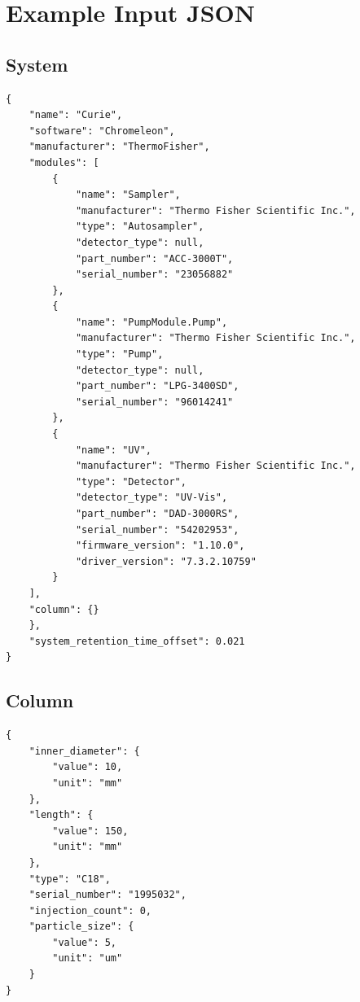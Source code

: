 \documentclass{article}
\begin{document}
\section{Example Input JSON}
\lstset{style=jsonstyle}
\subsection{System}
\begin{lstlisting}
{
    "name": "Curie",
    "software": "Chromeleon",
    "manufacturer": "ThermoFisher",
    "modules": [
        {
            "name": "Sampler",
            "manufacturer": "Thermo Fisher Scientific Inc.",
            "type": "Autosampler",
            "detector_type": null,
            "part_number": "ACC-3000T",
            "serial_number": "23056882"
        },
        {
            "name": "PumpModule.Pump",
            "manufacturer": "Thermo Fisher Scientific Inc.",
            "type": "Pump",
            "detector_type": null,
            "part_number": "LPG-3400SD",
            "serial_number": "96014241"
        },
        {
            "name": "UV",
            "manufacturer": "Thermo Fisher Scientific Inc.",
            "type": "Detector",
            "detector_type": "UV-Vis",
            "part_number": "DAD-3000RS",
            "serial_number": "54202953",
            "firmware_version": "1.10.0",
            "driver_version": "7.3.2.10759"
        }
    ],
    "column": {}
    },
    "system_retention_time_offset": 0.021
}
\end{lstlisting}
\subsection{Column}
\begin{lstlisting}
{
    "inner_diameter": {
        "value": 10,
        "unit": "mm"
    },
    "length": {
        "value": 150,
        "unit": "mm"
    },
    "type": "C18",
    "serial_number": "1995032",
    "injection_count": 0,
    "particle_size": {
        "value": 5,
        "unit": "um"
    }
}
\end{lstlisting}
\end{document}
